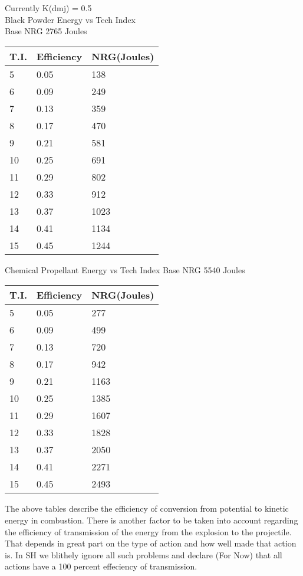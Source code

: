 Currently K(dmj) = 0.5 \\
Black Powder Energy vs Tech Index \\
Base NRG     2765 Joules \\

\begin{tabular}{lll} \hline 
T.I.   &  Efficiency    &    NRG(Joules) \\ \hline 
5	   &	0.05        &    138 \\
6		& 0.09          &    249 \\
7		& 0.13          &    359 \\
8		& 0.17          &    470 \\
9      	& 0.21          &    581 \\
10     	& 0.25          &    691 \\
11     	& 0.29          &    802 \\
12     	& 0.33          &    912 \\
13     	& 0.37          &    1023 \\
14     	& 0.41          &    1134 \\
15     	& 0.45          &    1244 \\ \hline 
\end{tabular}

Chemical Propellant Energy vs Tech Index
Base NRG     5540 Joules

\begin{tabular}{lll} \hline 
T.I.        & Efficiency      & NRG(Joules) \\ \hline 
5      		& 0.05            &   277 \\
6      		& 0.09            &   499 \\
7      		& 0.13            &   720 \\
8      		& 0.17            &   942 \\
9      		& 0.21           &   1163 \\
10     		& 0.25           &   1385 \\
11     		& 0.29           &   1607 \\
12     		& 0.33           &   1828 \\
13     		& 0.37           &   2050 \\
14     		& 0.41           &   2271 \\
15     		& 0.45           &   2493 \\ \hline 
\end{tabular}

The above tables describe the efficiency of conversion from 
potential to kinetic energy in combustion. There is another factor to 
be taken into account regarding the efficiency of transmission of the 
energy from the explosion to the projectile. That depends in great 
part on the type of action and how well made that action is. In SH we 
blithely ignore all such problems and declare (For Now) that all 
actions have a 100 percent effeciency of transmission.

